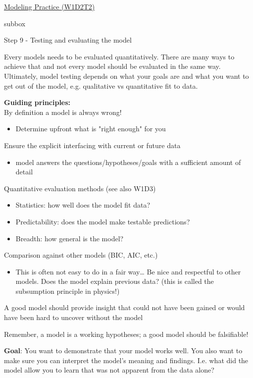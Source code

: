 \begin{textbox}{\href{https://compneuro.neuromatch.io/tutorials/W1D2_ModelingPractice/W1D2_Intro.html}{Modeling Practice  (W1D2T2)} }

\begin{subbox}{subbox}{Step 9 - Testing and evaluating the model

}
\scriptsize
Every models needs to be evaluated quantitatively. There are many ways to achieve that and not every model should be evaluated in the same way. Ultimately, model testing depends on what your goals are and what you want to get out of the model, e.g. qualitative vs quantitative fit to data. 

\textbf{Guiding principles:}\\
 By definition a model is always wrong!
  \begin{itemize}
    \item  Determine upfront what is "right enough" for you
    \end{itemize}
Ensure the explicit interfacing with current or future data

 \begin{itemize}
    \item  model answers the questions/hypotheses/goals with a sufficient amount of detail
    \end{itemize}
Quantitative evaluation methods (see also W1D3)
  \begin{itemize}
    \item  Statistics:  how well does the model fit data?
  \item Predictability: does the model make testable predictions?
  \item Breadth: how general is the model?
  \end{itemize}
 Comparison against other models (BIC, AIC, etc.)
\begin{itemize}
    \item  This is often not easy to do in a fair way… Be nice and respectful to other models.
Does the model explain previous data? (this is called the subsumption principle in physics!)
\end{itemize}
A good model should provide insight that could not have been gained or would have been hard to uncover without the model

Remember, a model is a working hypotheses; a good model should be falsifiable!

\textbf{Goal}: You want to demonstrate that your model works well. You also want to make sure you can interpret the model's meaning and findings. I.e. what did the model allow you to learn that was not apparent from the data alone?




\end{subbox}
\end{textbox}
